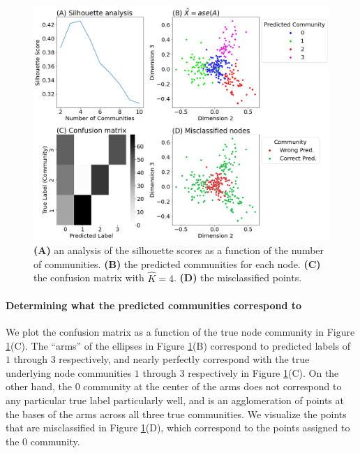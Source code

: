\begin{figure}[h]
    \centering
    \includegraphics[width=\linewidth]{applications/ch7/Images/comm_detect_kmclust.png}
    \caption[Unsupervised community detection without knowing number of communities]{\textbf{(A)} an analysis of the silhouette scores as a function of the number of communities. \textbf{(B)} the predicted communities for each node. \textbf{(C)} the confusion matrix with $\hat K = 4$. \textbf{(D)} the misclassified points.}
    \label{fig:ch7:comm_detect:kmclust}
\end{figure}


\paragraph*{Determining what the predicted communities correspond to}

We plot the confusion matrix as a function of the true node community in Figure \ref{fig:ch7:comm_detect:kmclust}(C). The ``arms'' of the ellipses in Figure \ref{fig:ch7:comm_detect:kmclust}(B) correspond to predicted labels of $1$ through $3$ respectively, and nearly perfectly correspond with the true underlying node communities $1$ through $3$ respectively in Figure \ref{fig:ch7:comm_detect:kmclust}(C). On the other hand, the $0$ community at the center of the arms does not correspond to any particular true label particularly well, and is an agglomeration of points at the bases of the arms across all three true communities. We visualize the points that are misclassified in Figure \ref{fig:ch7:comm_detect:kmclust}(D), which correspond to the points assigned to the $0$ community. 

